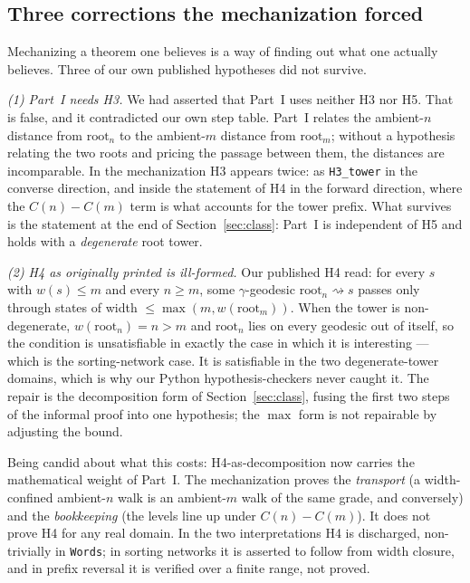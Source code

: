 \documentclass[11pt,a4paper]{article}
\theoremstyle{plain}
\theoremstyle{definition}
\theoremstyle{remark}
\newcommand{\wid}{w}
\begin{document}
\subsection{Three corrections the mechanization forced}\label{sec:corrections}

Mechanizing a theorem one believes is a way of finding out what one actually
believes. Three of our own published hypotheses did not survive.

\emph{(1) Part~I needs H3.} We had asserted that Part~I uses neither H3 nor H5.
That is false, and it contradicted our own step table. Part~I relates the
ambient-$n$ distance from $\mathrm{root}_n$ to the ambient-$m$ distance from
$\mathrm{root}_m$; without a hypothesis relating the two roots and pricing the
passage between them, the distances are incomparable. In the mechanization H3
appears twice: as \texttt{H3\_tower} in the converse direction, and inside the
statement of H4 in the forward direction, where the $C(n)-C(m)$ term is what
accounts for the tower prefix. What survives is the statement at the end of
Section~\ref{sec:class}: Part~I is independent of H5 and holds with a
\emph{degenerate} root tower.

\emph{(2) H4 as originally printed is ill-formed.} Our published H4 read: for
every $s$ with $\wid(s) \le m$ and every $n \ge m$, some $\gamma$-geodesic
$\mathrm{root}_n \rightsquigarrow s$ passes only through states of width
$\le \max(m, \wid(\mathrm{root}_m))$. When the tower is non-degenerate,
$\wid(\mathrm{root}_n) = n > m$ and $\mathrm{root}_n$ lies on every geodesic
out of itself, so the condition is unsatisfiable in exactly the case in which
it is interesting --- which is the sorting-network case. It is satisfiable in
the two degenerate-tower domains, which is why our Python hypothesis-checkers
never caught it. The repair is the decomposition form of
Section~\ref{sec:class}, fusing the first two steps of the informal proof into
one hypothesis; the $\max$ form is not repairable by adjusting the bound.

Being candid about what this costs: H4-as-decomposition now carries the
mathematical weight of Part~I. The mechanization proves the \emph{transport}
(a width-confined ambient-$n$ walk is an ambient-$m$ walk of the same grade,
and conversely) and the \emph{bookkeeping} (the levels line up under
$C(n)-C(m)$). It does not prove H4 for any real domain. In the two
interpretations H4 is discharged, non-trivially in \texttt{Words}; in sorting
networks it is asserted to follow from width closure, and in prefix reversal it
is verified over a finite range, not proved.
\end{document}

